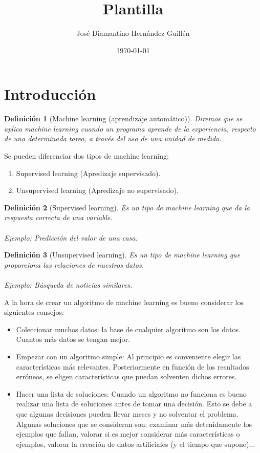 \documentclass[12pt,a4paper]{article}
\title{Plantilla}
\author{José Diamantino Hernández Guillén}
\date{\small{\today}}
\newtheorem{defi}{Definición}[subsection]
\begin{document}
  


\section{Introducción}
\begin{defi}[Machine learning (aprendizaje automático)]
Diremos que se aplica machine learning cuando un programa aprende de la experiencia, respecto de una determinada tarea, a través del uso de una unidad de medida.
\end{defi}

Se pueden diferenciar dos tipos de machine learning:
\begin{enumerate}
\item Supervised learning (Apredizaje supervisado).
\item Unsupervised learning (Apredizaje no supervisado).
\end{enumerate}

\begin{defi}[Supervised learning]
Es un tipo de machine learning que da la respuesta correcta de una variable. 
\\\\
Ejemplo: Predicción del valor de una casa.
\end{defi}

\begin{defi}[Unsupervised learning]
Es un tipo de machine learning que proporciona las relaciones de nuestros datos. 
\\\\
Ejemplo: Búsqueda de noticias similares.
\end{defi}

A la hora de crear un algoritmo de machine learning es bueno considerar los siguientes consejos:
\begin{itemize}
\item Coleccionar muchos datos: la base de cualquier algoritmo son los datos. Cuantos más datos se tengan mejor.
\item Empezar con un algoritmo simple: Al principio es conveniente elegir las características más relevantes. Posteriormente en función de los resultados erróneos, se eligen características que puedan solventen dichos errores.
\item Hacer una lista de soluciones: Cuando un algoritmo no funciona es bueno realizar una lista de soluciones antes de tomar una decisión. Esto se debe a que algunas decisiones pueden llevar meses y no solventar el problema. Algunas soluciones que se consideran son: examinar más detenidamente los ejemplos que fallan, valorar si es mejor considerar más características o ejemplos, valorar la creación de datos artificiales (y el tiempo que supone)...
\end{itemize}
\end{document}
